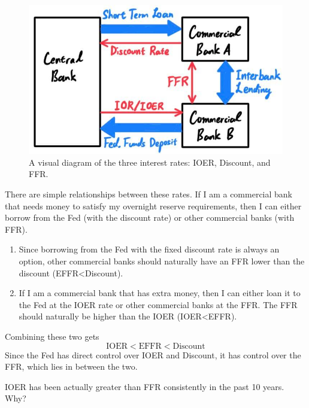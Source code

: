 \documentclass{article}
\begin{document}
    \begin{figure}[H]
      \centering 
      \includegraphics[scale=0.3]{img/3_Interest_Rates.jpg}
      \caption{A visual diagram of the three interest rates: IOER, Discount, and FFR. } 
      \label{fig:3_Interest_Rates}
    \end{figure}

    \begin{theorem}[FFR]
      There are simple relationships between these rates. If I am a commercial bank that needs money to satisfy my overnight reserve requirements, then I can either borrow from the Fed (with the discount rate) or other commercial banks (with FFR). 
      \begin{enumerate}
        \item Since borrowing from the Fed with the fixed discount rate is always an option, other commercial banks should naturally have an FFR lower than the discount (EFFR<Discount).
        \item If I am a commercial bank that has extra money, then I can either loan it to the Fed at the IOER rate or other commercial banks at the FFR. The FFR should naturally be higher than the IOER (IOER<EFFR). 
      \end{enumerate}
      Combining these two gets 
      \begin{equation}
        \text{IOER} < \text{EFFR} < \text{Discount}
      \end{equation}
      Since the Fed has direct control over IOER and Discount, it has control over the FFR, which lies in between the two. 
    \end{theorem}

    \begin{question}
      IOER has been actually greater than FFR consistently in the past 10 years. Why? 
    \end{question}
\end{document}
